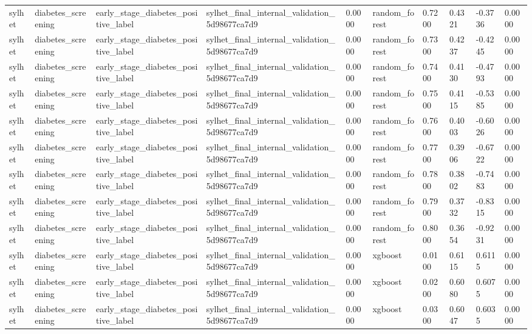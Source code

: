 \begin{tabular}{llllllllll}
sylhet & diabetes\_screening & early\_stage\_diabetes\_positive\_label & sylhet\_final\_internal\_validation\_5d98677ca7d9 & 0.0000 & random\_forest & 0.7200 & 0.4321 & -0.3736 & 0.0000 \\
sylhet & diabetes\_screening & early\_stage\_diabetes\_positive\_label & sylhet\_final\_internal\_validation\_5d98677ca7d9 & 0.0000 & random\_forest & 0.7300 & 0.4237 & -0.4245 & 0.0000 \\
sylhet & diabetes\_screening & early\_stage\_diabetes\_positive\_label & sylhet\_final\_internal\_validation\_5d98677ca7d9 & 0.0000 & random\_forest & 0.7400 & 0.4130 & -0.4793 & 0.0000 \\
sylhet & diabetes\_screening & early\_stage\_diabetes\_positive\_label & sylhet\_final\_internal\_validation\_5d98677ca7d9 & 0.0000 & random\_forest & 0.7500 & 0.4115 & -0.5385 & 0.0000 \\
sylhet & diabetes\_screening & early\_stage\_diabetes\_positive\_label & sylhet\_final\_internal\_validation\_5d98677ca7d9 & 0.0000 & random\_forest & 0.7600 & 0.4003 & -0.6026 & 0.0000 \\
sylhet & diabetes\_screening & early\_stage\_diabetes\_positive\_label & sylhet\_final\_internal\_validation\_5d98677ca7d9 & 0.0000 & random\_forest & 0.7700 & 0.3906 & -0.6722 & 0.0000 \\
sylhet & diabetes\_screening & early\_stage\_diabetes\_positive\_label & sylhet\_final\_internal\_validation\_5d98677ca7d9 & 0.0000 & random\_forest & 0.7800 & 0.3802 & -0.7483 & 0.0000 \\
sylhet & diabetes\_screening & early\_stage\_diabetes\_positive\_label & sylhet\_final\_internal\_validation\_5d98677ca7d9 & 0.0000 & random\_forest & 0.7900 & 0.3732 & -0.8315 & 0.0000 \\
sylhet & diabetes\_screening & early\_stage\_diabetes\_positive\_label & sylhet\_final\_internal\_validation\_5d98677ca7d9 & 0.0000 & random\_forest & 0.8000 & 0.3654 & -0.9231 & 0.0000 \\
sylhet & diabetes\_screening & early\_stage\_diabetes\_positive\_label & sylhet\_final\_internal\_validation\_5d98677ca7d9 & 0.0000 & xgboost & 0.0100 & 0.6115 & 0.6115 & 0.0000 \\
sylhet & diabetes\_screening & early\_stage\_diabetes\_positive\_label & sylhet\_final\_internal\_validation\_5d98677ca7d9 & 0.0000 & xgboost & 0.0200 & 0.6080 & 0.6075 & 0.0000 \\
sylhet & diabetes\_screening & early\_stage\_diabetes\_positive\_label & sylhet\_final\_internal\_validation\_5d98677ca7d9 & 0.0000 & xgboost & 0.0300 & 0.6047 & 0.6035 & 0.0000 \\

\end{tabular}
